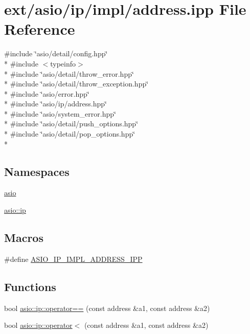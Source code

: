 \hypertarget{address_8ipp}{}\section{ext/asio/ip/impl/address.ipp File Reference}
\label{address_8ipp}
{\ttfamily \#include \char`\"{}asio/detail/config.\+hpp\char`\"{}}\\*
{\ttfamily \#include $<$typeinfo$>$}\\*
{\ttfamily \#include \char`\"{}asio/detail/throw\+\_\+error.\+hpp\char`\"{}}\\*
{\ttfamily \#include \char`\"{}asio/detail/throw\+\_\+exception.\+hpp\char`\"{}}\\*
{\ttfamily \#include \char`\"{}asio/error.\+hpp\char`\"{}}\\*
{\ttfamily \#include \char`\"{}asio/ip/address.\+hpp\char`\"{}}\\*
{\ttfamily \#include \char`\"{}asio/system\+\_\+error.\+hpp\char`\"{}}\\*
{\ttfamily \#include \char`\"{}asio/detail/push\+\_\+options.\+hpp\char`\"{}}\\*
{\ttfamily \#include \char`\"{}asio/detail/pop\+\_\+options.\+hpp\char`\"{}}\\*
\subsection*{Namespaces}
\begin{DoxyCompactItemize}
\item 
 \hyperlink{namespaceasio}{asio}
\item 
 \hyperlink{namespaceasio_1_1ip}{asio\+::ip}
\end{DoxyCompactItemize}
\subsection*{Macros}
\begin{DoxyCompactItemize}
\item 
\#define \hyperlink{address_8ipp_afc29dca96f682100ad6098a558377071}{A\+S\+I\+O\+\_\+\+I\+P\+\_\+\+I\+M\+P\+L\+\_\+\+A\+D\+D\+R\+E\+S\+S\+\_\+\+I\+P\+P}
\end{DoxyCompactItemize}
\subsection*{Functions}
\begin{DoxyCompactItemize}
\item 
bool \hyperlink{namespaceasio_1_1ip_ac81a73710f560ec78c381a7e4e23836f}{asio\+::ip\+::operator==} (const address \&a1, const address \&a2)
\item 
bool \hyperlink{namespaceasio_1_1ip_a71d4ba892e407bde46ae6d9ea712b82f}{asio\+::ip\+::operator$<$} (const address \&a1, const address \&a2)
\end{DoxyCompactItemize}


